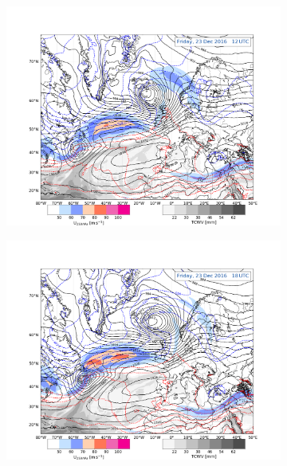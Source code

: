 \begin{figure}[ht!]
	\begin{subfigure}[b]{0.49\textwidth}
		\includegraphics[trim={4.2cm 0cm 4.3cm 5.1cm},clip,
		width=\textwidth]{./fig_Geopot_Jet/20161223_12}
		\caption{} \label{fig:GP23}
	\end{subfigure}
	\begin{subfigure}[b]{0.49\textwidth}
		\includegraphics[trim={4.2cm 0cm 4.3cm 5.1cm},clip,
		width=\textwidth]{./fig_Geopot_Jet/20161223_18}
		\caption{} \label{fig:GP23_18}
	\end{subfigure}
	\begin{subfigure}[b]{0.49\textwidth}

\end{subfigure}
\end{figure}
